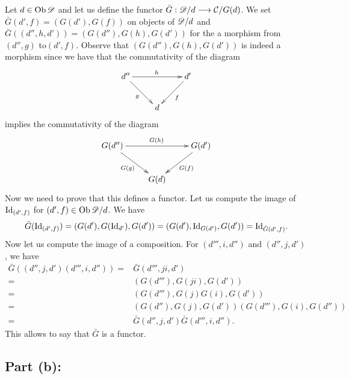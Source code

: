 \documentclass[11pt, a4paper, twoside]{article}
\begin{document}
Let $d\in\operatorname{Ob}\mathscr D$ and let us define the functor $\bar{G}:\mathscr D/d\longrightarrow\mathcal{C}/G(d)$. We set $\bar{G}(d',f)=(G(d'),G(f))$ on objects of $\mathscr D/d$ and $\bar{G}((d'',h,d'))=(G(d''),G(h),G(d'))$ for the a morphism from $(d'',g)$ to$(d',f)$. Observe that $(G(d''),G(h),G(d'))$ is indeed a morphism since we have that the commutativity of the diagram 
\begin{displaymath}
	\xymatrix{
		d'' \ar[rd]_g \ar[rr]^h & & d' \ar[ld]^f\\
		& d
	}
\end{displaymath}
implies the commutativity of the diagram
\begin{displaymath}
	\xymatrix{
		G(d'') \ar[rd]_{G(g)} \ar[rr]^{G(h)} & & {G(d')} \ar[ld]^{G(f)}\\
		& G(d)
	}
\end{displaymath}
  Now we need to prove that this defines a functor. Let us compute the image of $\mathrm{Id}_{(d',f)}$ for $(d',f)\in\operatorname{Ob}\mathscr D/d$. We have 
\begin{displaymath}
	\bar{G}(\mathrm{Id}_{(d',f)})=(G(d'),G(\mathrm{Id}_{d'}),G(d'))=(G(d'),\mathrm{Id}_{G(d')},G(d'))=\mathrm{Id}_{\bar{G}(d',f)}.
\end{displaymath}
	Now let us compute the image of a composition. For $(d''',i,d'')$ and $(d'',j,d')$, we have 
\begin{align*}
	\bar{G}((d'',j,d')(d''',i,d''))  =&   \bar{G}(d''',ji,d')\\
							=& (G(d'''),G(ji),G(d'))\\
	                                      =& (G(d'''),G(j)G(i),G(d'))\\
	                                      =& (G(d''),G(j),G(d'))(G(d'''),G(i),G(d''))\\
	                                      =& \bar{G}(d'',j,d')\bar{G}(d''',i,d'').
\end{align*}
This allows to say that $\bar{G}$ is a functor.

\subsection*{Part (b):}
\end{document}
